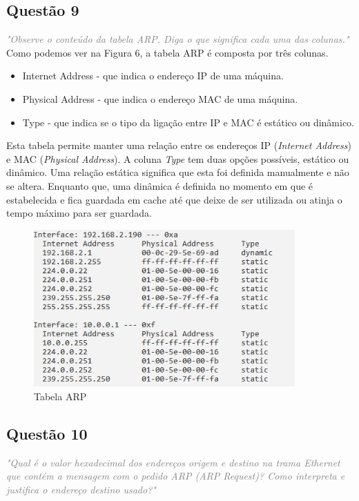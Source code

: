 \documentclass{llncs}
\newcommand{\questionE}[1]{\textcolor{gray}{\textit{"#1"}}}
\begin{document}
\subsection{Questão 9}
\hspace{3mm} 
\questionE{Observe o conteúdo da tabela ARP. Diga o que significa cada uma das colunas.}\\

Como podemos ver na Figura 6, a tabela ARP é composta por três colunas.
\begin{itemize}
\item{Internet Address} - que indica o endereço IP de uma máquina.
\item{Physical Address} - que indica o endereço MAC de uma máquina.
\item{Type} - que indica se o tipo da ligação entre IP e MAC é estático ou dinâmico.
\end{itemize}

Esta tabela permite manter uma relação entre os endereços IP (\textit{Internet Address}) e MAC (\textit{Physical Address}). A coluna \textit{Type} tem duas opções possíveis, estático ou dinâmico. Uma relação estática significa que esta foi definida manualmente e não se altera. Enquanto que, uma dinâmica é definida no momento em que é estabelecida e fica guardada em cache até que deixe de ser utilizada ou atinja o tempo máximo para ser guardada.  

\begin{figure}[H]
\begin{center}
\includegraphics[width=10cm]{9tabelaARP.PNG}
\end{center}
\caption{Tabela ARP}
\end{figure}

\subsection{Questão 10}
\hspace{3mm} 
\questionE{Qual	é o valor hexadecimal dos endereços origem e destino na trama Ethernet que contém a mensagem com o pedido ARP (ARP Request)? Como interpreta e justifica o endereço destino usado?}\\
\end{document}
